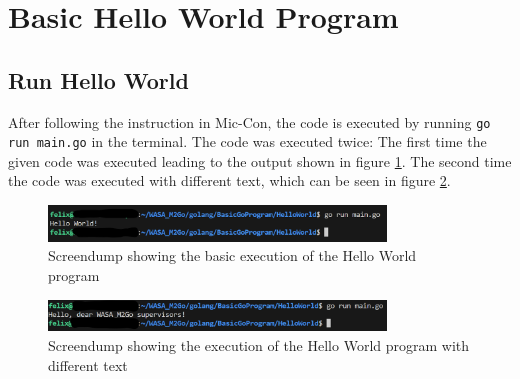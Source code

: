 \label{sec:basic_hello_world_program}

\section{Basic Hello World Program}

\subsection{Run Hello World}
After following the instruction in Mic-Con, the code is executed by running \texttt{go run main.go} in the terminal.
The code was executed twice: The first time the given code was executed leading to the output shown in figure \ref{fig:screendump_helloWorld_basicExecution}.
The second time the code was executed with different text, which can be seen in figure \ref{fig:screendump_helloWorld_differentText}.

\begin{figure} [h]
    \centering
    \includegraphics[width=0.8\textwidth]{figures/goLang/helloWorld/golang_helloWorld_basicExecution.png}
    \caption{Screendump showing the basic execution of the Hello World program}
    \label{fig:screendump_helloWorld_basicExecution}
\end{figure}

\begin{figure}[h]
    \centering
    \includegraphics[width=0.8\textwidth]{figures/goLang/helloWorld/golang_helloWorld_ExecutionDifferentText.png}
    \caption{Screendump showing the execution of the Hello World program with different text}
    \label{fig:screendump_helloWorld_differentText}
\end{figure}

